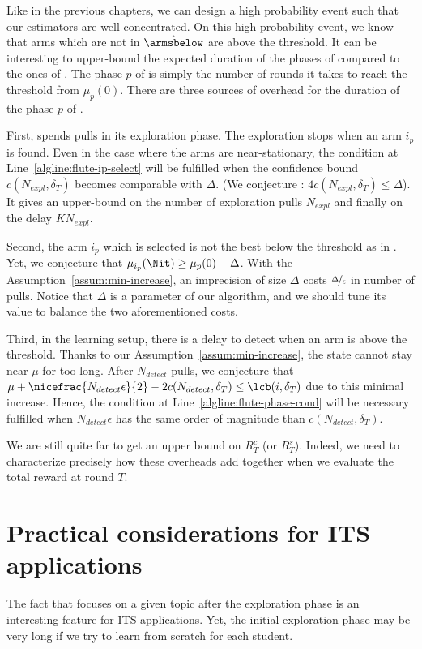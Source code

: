 Like in the previous chapters, we can design a high probability event such that our estimators are well concentrated. On this high probability event, we know that arms which are not in $\hat{\armsbelow}$ are above the threshold. It can be interesting to upper-bound the expected duration of the phases of \FLUTE compared to the ones of \FLUT. The phase $p$ of \FLUT is simply the number of rounds it takes to reach the threshold from $\mu_{p}(0)$. There are three sources of overhead for the duration of the phase $p$ of \FLUTE. 

First, \FLUTE spends pulls in its exploration phase. The exploration stops when an arm $i_p$ is found. Even in the case where the arms are near-stationary, the condition at Line~\ref{algline:flute-ip-select} will be fulfilled when the confidence bound $c(N_{expl},\delta_T)$ becomes comparable with $\Delta$. (We conjecture : $4c(N_{expl}, \delta_T) \leq \Delta$). It gives an upper-bound on the number of exploration pulls $N_{expl}$ and finally on the delay $KN_{expl}$.

Second, the arm $i_p$ which is selected is not the best below the threshold as in \FLUT. Yet, we conjecture that $\mu_{i_p}(\Nit) \geq \mu_{p}(0) -\Delta$. With the Assumption~\ref{assum:min-increase}, an imprecision of size $\Delta$ costs $\nicefrac{\Delta}{\epsilon}$ in number of pulls. Notice that $\Delta$ is a parameter of our algorithm, and we should tune its value to balance the two aforementioned costs.

Third, in the learning setup, there is a delay to detect when an arm is above the threshold. Thanks to our Assumption~\ref{assum:min-increase}, the state cannot stay near $\mu$ for too long. After $N_{detect}$ pulls, we conjecture that
$\mu +\nicefrac{N_{detect}\epsilon}{2} - 2c(N_{detect}, \delta_T) \leq \lcb(i, \delta_T)$ due to this minimal increase. Hence, the condition at Line~\ref{algline:flute-phase-cond} will be necessary fulfilled when $N_{detect}\epsilon$ has the same order of magnitude than $c(N_{detect}, \delta_T)$.

We are still quite far to get an upper bound on $R^{c}_T$ (or $R^{s}_T$). Indeed, we need to characterize precisely how these overheads add together when we evaluate the total reward at round $T$.

\section{Practical considerations for ITS applications}
The fact that \FLUTE focuses on a given topic after the exploration phase is an interesting feature for ITS applications. Yet, the initial exploration phase may be very long if we try to learn from scratch for each student. 

